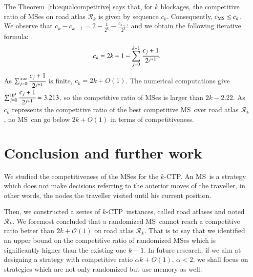 \documentclass[preprint]{elsarticle}
\newcommand{\kctp}{$k$-CTP}
\newcommand{\mcalr}{\mathcal{R}}
\newcommand{\mts}{MS}
\newcommand{\cms}{c_{\mbox{\scriptsize{MS}}}}
\begin{document}
The Theorem~\ref{th:equalcompetitive} says that, for $k$ blockages, the competitive ratio of \mts es on road atlas $\mcalr_k$ is given by sequence $c_k$. Consequently, $\cms \le c_k$.
We observe that $c_k - c_{k-1} = 2 - \frac{1}{2^{k}} - \frac{c_{k-1}}{2^{k}}$
and we obtain the following iterative formula:
\[
c_k = 2k+1-\sum_{j=0}^{k-1}\cfrac{c_j+1}{2^{j+1}}.
\]
As $\sum_{j=0}^{+\infty}\cfrac{c_j+1}{2^{j+1}}$ is finite, $c_k = 2k + O(1)$. The numerical computations give $\sum_{j=0}^{10^4}\cfrac{c_j+1}{2^{j+1}} = 3.213$, so the competitive ratio of \mts es is larger than $2k-2.22$. As $c_k$ represents the competitive ratio of the best competitive \mts ~over road atlas $\mcalr_k$, no \mts ~can go below $2k+O\left(1\right)$ in terms of competitiveness.
\section{Conclusion and further work} \label{sec:conclusion}

We studied the competitiveness of the \mts es for the \kctp. An \mts ~is a strategy which does not make decisions referring to the anterior moves of the traveller, in other words, the nodes the traveller visited until his current position.

Then, we constructed a series of \kctp ~instances, called road atlases and noted $\mcalr_k$. 
We foremost concluded that a randomized  \mts ~cannot reach a competitive ratio better than $2k+\mathcal{O}\left(1\right)$ on road atlas $\mcalr_k$. That is to say that we identified an upper bound on the competitive ratio of randomized \mts{}es which is significantly higher than the existing one $k+1$. In future research, if we aim at designing a strategy with competitive ratio $\alpha k + O\left(1\right)$, $\alpha < 2$, we shall focus on strategies which are not only randomized but use memory as well.



\end{document}

